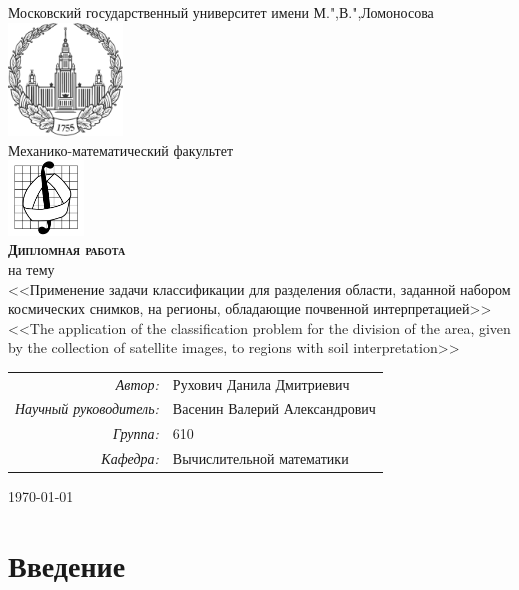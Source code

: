 \documentclass[14pt]{extarticle}
\begin{document}
\begin{titlepage}
\thispagestyle{empty}
\begin{center}
\LARGE{Московский государственный университет имени М.",В.",Ломоносова}\\[.5cm]
\includegraphics[height=30mm]{imgs/msu_logo.png}\\[.5cm]
\Large{Механико-математический факультет}\\[.5cm]
\includegraphics[height=20mm]{imgs/mech_math_logo.png}\\[.5cm]
\Huge{\textbf{\textsc{Дипломная работа}}}\\[.5em]
\normalsize на тему \large\\[.5em]
<<Применение задачи классификации для разделения области, 
заданной набором космических снимков, на регионы,
обладающие почвенной интерпретацией>>\\
<<The application of the classification problem for the division
of the area, given by the collection of satellite images,
to regions with soil interpretation>>\\[3em]
\normalsize
\begin{flushright}
\begin{tabular}{rl}
\emph{Автор:} & Рухович Данила Дмитриевич \\
\emph{Научный руководитель:} & Васенин Валерий Александрович \\
\emph{Группа:} & 610 \\
\emph{Кафедра:} & Вычислительной математики \\
\end{tabular}
\end{flushright}
\vfill
{\today}
\end{center}
\end{titlepage}

\newpage
\tableofcontents
\newpage

\section{Введение}
\end{document}
